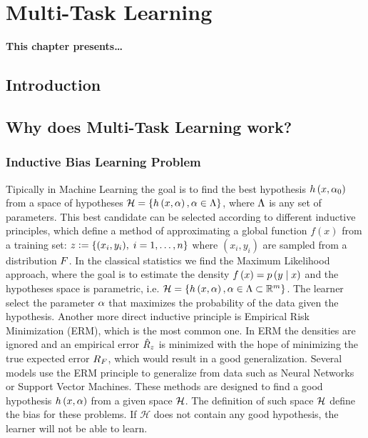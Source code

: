 
\chapter{Multi-Task Learning} %
\label{Chapter2}

{\bf \small{
This chapter presents\dots
}}

\section{Introduction}



\section{Why does Multi-Task Learning work?}
% 
\subsection{Inductive Bias Learning Problem} %
Tipically in Machine Learning the goal is to find the best hypothesis $h\left(x, \alpha_0\right)$ from a space of hypotheses $\mathcal{H} = \left\{h\left(x, \alpha\right), \alpha \in \Lambda\right\}$, where $\Lambda$ is any set of parameters. This best candidate can be selected according to different inductive principles, which define a method of approximating a global function $f(x)$ from a training set:
$ z \vcentcolon= \left\{(x_i, y_i),\; i=1, \ldots, n\right\} $
where $(x_i, y_i)$ are sampled from a distribution $F$.
%
In the classical statistics we find the Maximum Likelihood approach, where the goal is to estimate the density $f\left(x\right) = p\left( y \;\middle\vert\; x \right)$ and the hypotheses space is parametric, i.e. $\mathcal{H} = \left\{h\left(x, \alpha\right), \alpha \in \Lambda \subset \mathbb{R}^m\right\}$. The learner select the parameter $\alpha$ that maximizes the probability of the data given the hypothesis.
%
Another more direct inductive principle is Empirical Risk Minimization (ERM), which is the most common one. In ERM the densities are ignored and an empirical error $\hat{R}_z$ is minimized with the hope of minimizing the true expected error $R_F$, which would result in a good generalization. 
%
Several models use the ERM principle to generalize from data such as Neural Networks or Support Vector Machines. These methods are designed to find a good hypothesis $h\left(x, \alpha\right)$ from a given space $\mathcal{H}$. The definition of such space $\mathcal{H}$ define the bias for these problems. If $\mathcal{H}$ does not contain any good hypothesis, the learner will not be able to learn.
%

